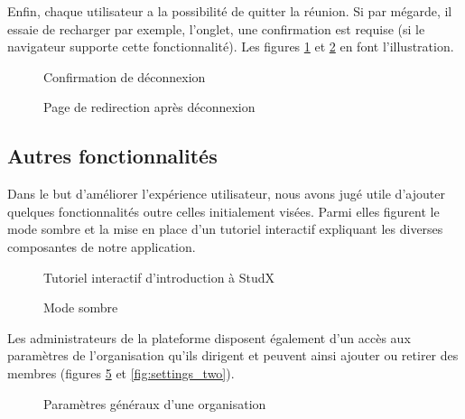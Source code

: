 Enfin, chaque utilisateur a la possibilité de quitter la réunion. Si par mégarde, il essaie de recharger par exemple, l’onglet, une confirmation est requise (si le navigateur supporte cette fonctionnalité). 
Les figures \ref{fig:confirm_exit} et \ref{fig:exited} en font l'illustration.

\newpage
\begin{figure}[h]
  \centering
  \caption{Confirmation de déconnexion}
  \label{fig:confirm_exit}
\end{figure}

\begin{figure}[h]
  \centering
  \caption{Page de redirection après déconnexion}
  \label{fig:exited}
\end{figure}

\subsection{Autres fonctionnalités}
Dans le but d'améliorer l'expérience utilisateur, nous avons jugé utile d’ajouter quelques fonctionnalités outre celles initialement visées. 
Parmi elles figurent le mode sombre et la mise en place d’un tutoriel interactif expliquant les diverses composantes de notre application. 

\newpage
\begin{figure}[h]
  \centering
  \caption{Tutoriel interactif d’introduction à StudX}
  \label{fig:onboarding}
\end{figure}


\begin{figure}[h]
  \centering
  \caption{Mode sombre}
  \label{fig:dark_mode}
\end{figure}

Les administrateurs de la plateforme disposent également d’un accès aux paramètres de 
l'organisation qu’ils dirigent et peuvent ainsi ajouter ou retirer des membres (figures \ref{fig:settings_one} et \ref{fig:settings_two}).

\begin{figure}[h]
  \centering
  \caption{Paramètres généraux d'une organisation}
  \label{fig:settings_one}
\end{figure}

